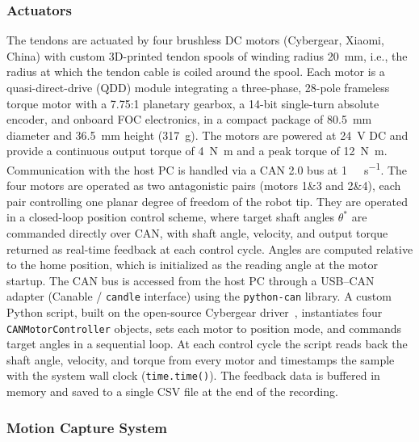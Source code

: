 \documentclass[14pt, a4paper]{article}
\begin{document}
\subsubsection{Actuators}

The tendons are actuated by four brushless DC motors (Cybergear, Xiaomi, China) with custom 3D-printed tendon spools of winding radius \SI{20}{\milli\metre}, i.e., the radius at which the tendon cable is coiled around the spool. 
Each motor is a quasi-direct-drive (QDD) module integrating a three-phase, 28-pole frameless torque motor with a 7.75:1 planetary gearbox, a 14-bit single-turn absolute encoder, and onboard FOC electronics, in a compact package of \SI{80.5}{\milli\metre} diameter and \SI{36.5}{\milli\metre} height (\SI{317}{\gram}). 
The motors are powered at \SI{24}{\volt} DC and provide a continuous output torque of 
\SI{4}{\newton\metre} and a peak torque of \SI{12}{\newton\metre}. 
Communication with the host PC is handled via a CAN 2.0 bus at \SI{1}{\mega\bit\per\second}. 
The four motors are operated as two antagonistic pairs (motors 1\&3 and 2\&4), each pair controlling one planar degree of freedom of the robot tip. 
They are operated in a closed-loop position control scheme, where target shaft angles 
$\theta^*$ are commanded directly over CAN, with shaft angle, velocity, and output torque returned as real-time feedback at each control cycle. 
Angles are computed relative to the home position, which is initialized as the reading angle at the motor startup.
The CAN bus is accessed from the host PC through a USB--CAN adapter (Canable / \texttt{candle} interface) using the \texttt{python-can} library.
A custom Python script, built on the open-source Cybergear driver~\cite{CybergearDocs}, instantiates four \texttt{CANMotorController} objects, sets each motor to position mode, and commands target angles in a sequential loop.
At each control cycle the script reads back the shaft angle, velocity, and torque from every motor and timestamps the sample with the system wall clock (\texttt{time.time()}).
The feedback data is buffered in memory and saved to a single CSV file at the end of the recording.

\subsubsection{Motion Capture System}
\end{document}

